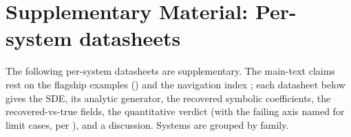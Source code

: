 \documentclass[11pt]{article}
\begin{document}
\section*{Supplementary Material: Per-system datasheets}\label{app:datasheets}

The following per-system datasheets are supplementary. The main-text claims rest on the flagship
examples () and the navigation index ; each datasheet below
gives the SDE, its analytic generator, the recovered symbolic coefficients, the
recovered-vs-true fields, the quantitative verdict (with the failing axis named for limit cases,
per ), and a discussion. Systems are grouped by family.


\end{document}
